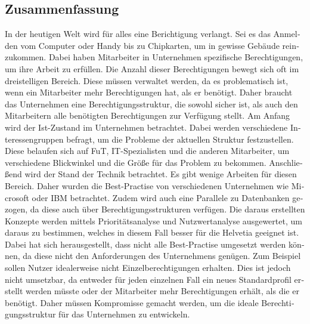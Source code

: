 \begin{otherlanguage}{ngerman}
	\chapter*{Zusammenfassung}
In der heutigen Welt wird für alles eine Berichtigung verlangt.
Sei es das Anmelden vom Computer oder Handy bis zu Chipkarten, um in gewisse Gebäude reinzukommen.
Dabei haben Mitarbeiter in Unternehmen spezifische Berechtigungen, um ihre Arbeit zu erfüllen.
Die Anzahl dieser Berechtigungen bewegt sich oft im dreistelligen Bereich.
Diese müssen verwaltet werden, da es problematisch ist, wenn ein Mitarbeiter mehr Berechtigungen hat, als er benötigt.
Daher braucht das Unternehmen eine Berechtigungsstruktur, die sowohl sicher ist, als auch den Mitarbeitern alle benötigten Berechtigungen zur Verfügung stellt.
\newline
Am Anfang wird der Ist-Zustand im Unternehmen betrachtet.
Dabei werden verschiedene Interessengruppen befragt, um die Probleme der aktuellen Struktur festzustellen.
Diese belaufen sich auf \ac{FuT}, IT-Spezialisten und die anderen Mitarbeiter, um verschiedene Blickwinkel und die Größe für das Problem zu bekommen.
Anschließend wird der Stand der Technik betrachtet.
Es gibt wenige Arbeiten für diesen Bereich.
Daher wurden die Best-Practise von verschiedenen Unternehmen wie Microsoft oder IBM betrachtet.
Zudem wird auch eine Parallele zu Datenbanken gezogen, da diese auch über Berechtigungsstrukturen verfügen.
Die daraus erstellten Konzepte werden mittels Prioritätsanalyse und Nutzwertanalyse ausgewertet, um daraus zu bestimmen, welches in diesem Fall besser für die Helvetia geeignet ist.
\newline
Dabei hat sich herausgestellt, dass nicht alle Best-Practise umgesetzt werden können, da diese nicht den Anforderungen des Unternehmens genügen.
Zum Beispiel sollen Nutzer idealerweise nicht Einzelberechtigungen erhalten.
Dies ist jedoch nicht umsetzbar, da entweder für jeden einzelnen Fall ein neues Standardprofil erstellt werden müsste oder der Mitarbeiter mehr Berechtigungen erhält, als die er benötigt.
Daher müssen Kompromisse gemacht werden, um die ideale Berechtigungsstruktur für das Unternehmen zu entwickeln.
\end{otherlanguage}

